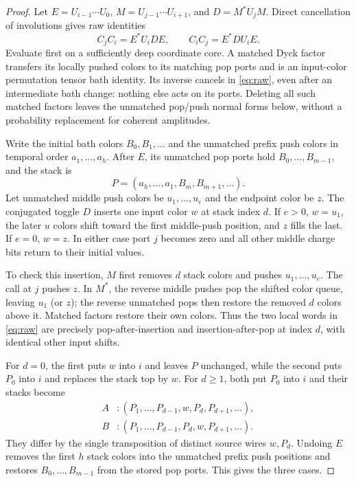 \documentclass[11pt]{article}
\begin{document}
\begin{proof}
Let $E=U_{i-1}\cdots U_0$, $M=U_{j-1}\cdots U_{i+1}$, and
$D=M^*U_jM$. Direct cancellation of involutions gives raw identities
\begin{equation}\label{eq:raw}
 C_jC_i=E^*U_iDE,\qquad C_iC_j=E^*DU_iE.
\end{equation}
Evaluate first on a sufficiently deep coordinate core. A matched Dyck
factor transfers its locally pushed colors to its matching pop ports
and is an input-color permutation tensor bath identity. Its inverse
cancels in \eqref{eq:raw}, even after an intermediate bath change:
nothing else acts on its ports. Deleting all such matched factors leaves
the unmatched pop/push normal forms below, without a probability
replacement for coherent amplitudes.

Write the initial bath colors $B_0,B_1,\ldots$ and the unmatched prefix
push colors in temporal order $a_1,\ldots,a_h$. After $E$, its unmatched
pop ports hold $B_0,\ldots,B_{m-1}$, and the stack is
\begin{equation}\label{eq:prefixstack}
 P=(a_h,\ldots,a_1,B_m,B_{m+1},\ldots).
\end{equation}
Let unmatched middle push colors be $u_1,\ldots,u_e$ and the endpoint
color be $z$. The conjugated toggle $D$ inserts one input color $w$ at
stack index $d$. If $e>0$, $w=u_1$, the later $u$ colors shift toward
the first middle-push position, and $z$ fills the last. If $e=0$, $w=z$.
In either case port $j$ becomes zero and all other middle charge bits
return to their initial values.

To check this insertion, $M$ first removes $d$ stack colors and pushes
$u_1,\ldots,u_e$. The call at $j$ pushes $z$. In $M^*$, the reverse
middle pushes pop the shifted color queue, leaving $u_1$ (or $z$);
the reverse unmatched pops then restore the removed $d$ colors above
it. Matched factors restore their own colors. Thus the two local words
in \eqref{eq:raw} are precisely pop-after-insertion and
insertion-after-pop at index $d$, with identical other input shifts.

For $d=0$, the first puts $w$ into $i$ and leaves $P$ unchanged, while
the second puts $P_0$ into $i$ and replaces the stack top by $w$.
For $d\ge1$, both put $P_0$ into $i$ and their stacks become
\begin{align}
 A&:(P_1,\ldots,P_{d-1},w,P_d,P_{d+1},\ldots),\label{eq:stackA}\\
 B&:(P_1,\ldots,P_{d-1},P_d,w,P_{d+1},\ldots).\label{eq:stackB}
\end{align}
They differ by the single transposition of distinct source wires $w,P_d$.
Undoing $E$ removes the first $h$ stack colors into the unmatched prefix
push positions and restores $B_0,\ldots,B_{m-1}$ from the stored pop
ports. This gives the three cases.


\end{proof}
\end{document}
